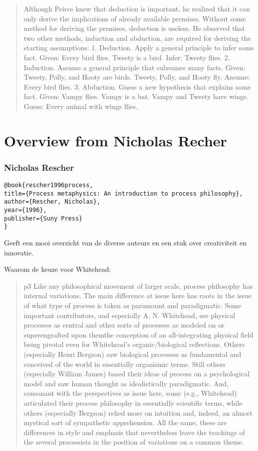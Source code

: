 \documentclass[a4paper]{Thesis}
\begin{document}
\begin{quotation}
	Although Peirce knew that deduction is important, he realized that it can only
	derive the implications of already available premises. Without some method for
	deriving the premises, deduction is useless. He observed that two other methods,
	induction and abduction, are required for deriving the starting assumptions:
	1. Deduction. Apply a general principle to infer some fact.
	Given: Every bird flies. Tweety is a bird.
	Infer: Tweety flies.
	2. Induction. Assume a general principle that subsumes many facts.
	Given: Tweety, Polly, and Hooty are birds.
	Tweety, Polly, and Hooty fly.
	Assume: Every bird flies.
	3. Abduction. Guess a new hypothesis that explains some fact.
	Given: Vampy flies. Vampy is a bat. Vampy and Tweety have wings.
	Guess: Every animal with wings flies.
	
\end{quotation}

\section{Overview from Nicholas Recher}

\subsubsection{Nicholas Rescher}
\begin{verbatim}
@book{rescher1996process,
title={Process metaphysics: An introduction to process philosophy},
author={Rescher, Nicholas},
year={1996},
publisher={Suny Press}
}
\end{verbatim}

Geeft een mooi overzicht van de diverse auteurs en een stuk over creativiteit en innovatie.

Waarom de keuze voor Whitehead:
\begin{quotation}
	p3
	Like any philosophical movement of larger scale, process philosophy has internal
	variations. The main difference at issue here has roots in the issue of what type of
	process is taken as paramount and paradigmatic. Some important contributors, and
	especially A. N. Whitehead, see physical processes as central and other sorts of processes
	as modeled on or superengrafted upon themthe conception of an all-integrating physical
	field being pivotal even for Whitehead's organic/biological reflections. Others (especially
	Henri Bergson) saw biological processes as fundamental and conceived of the world in
	essentially organismic terms. Still others (especially William James) based their ideas of
	process on a psychological model and saw human thought as idealistically paradigmatic.
	And, consonant with the perspectives as issue here, some (e.g., Whitehead) articulated
	their process philosophy in essentially scientific terms, while others (especially Bergson)
	relied more on intuition and, indeed, an almost mystical sort of sympathetic
	apprehension. All the same, these are differences in style and emphasis that nevertheless
	leave the teachings of the several processists in the position of variations on a common
	theme.
\end{quotation}
\end{document}
